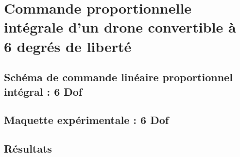\chapter{Commande proportionnelle intégrale d'un drone convertible à 6 degrés de liberté}
\minitoc

\section{Schéma de commande linéaire proportionnel intégral : 6 Dof}

\section{Maquette expérimentale : 6 Dof}

\section{Résultats}






